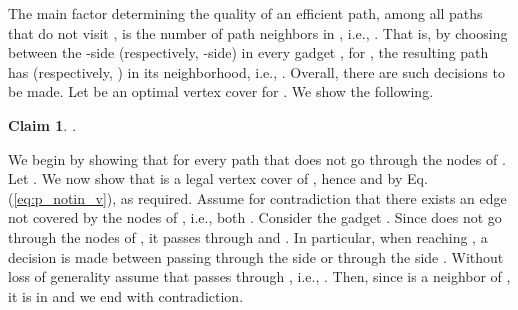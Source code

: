 \documentclass[12pt]{article}
\newtheorem{claim}{Claim}[section]
\def\Proof{\par\noindent{\bf Proof:~}}
\begin{document}
The main factor determining the quality of an efficient path, among all paths that do not visit , is the number of path neighbors in , i.e., . That is, by choosing between the -side (respectively, -side) in every gadget , for , the resulting path has  (respectively, ) in its neighborhood, i.e., . Overall, there are  such decisions to be made. Let  be an optimal vertex cover for . We show the following.
\begin{claim}
\label{cl:vc}
.
\end{claim}
\Proof
We begin by showing that  for every  path  that does not go through the nodes of .
Let . We now show that  is a legal vertex cover of , hence  and by Eq. (\ref{eq:p_notin_v}),  as required. Assume for contradiction that there exists an edge  not covered by the nodes of , i.e., both . Consider the gadget . Since  does not go through the nodes of , it passes through  and . In particular, when reaching , a decision is made between passing through the  side  or through the  side . Without loss of generality assume that  passes through , i.e., . Then, since  is a neighbor of , it is in  and we end with contradiction.
\end{document}
